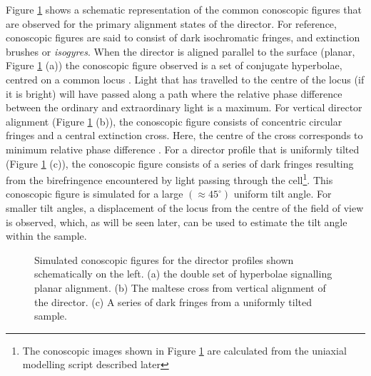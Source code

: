 Figure \ref{fig:con_samples} shows a schematic representation of the common conoscopic figures that are observed for the primary alignment states of the director. For reference, conoscopic figures are said to consist of dark isochromatic fringes, and extinction brushes or \textit{isogyres}. When the director is aligned parallel to the surface (planar, Figure \ref{fig:con_samples} (a)) the conoscopic figure observed is a set of conjugate hyperbolae, centred on a common locus \cite{Horn2001}. Light that has travelled to the centre of the locus (if it is bright) will have passed along a path where the relative phase difference between the ordinary and extraordinary light is a maximum. For vertical director alignment (Figure \ref{fig:con_samples} (b)), the conoscopic figure consists of concentric circular fringes and a central extinction cross. Here, the centre of the cross corresponds to minimum relative phase difference \cite{Horn2001}. For a director profile that is uniformly tilted (Figure \ref{fig:con_samples} (c)), the conoscopic figure consists of a series of dark fringes resulting from the birefringence encountered by light passing through the cell\footnote{The conoscopic images shown in Figure \ref{fig:con_samples} are calculated from the uniaxial modelling script described later}. This conoscopic figure is simulated for a large $\left(\approx45^{\circ}\right)$ uniform tilt angle. For smaller tilt angles, a displacement of the locus from the centre of the field of view is observed, which, as will be seen later, can be used to estimate the tilt angle within the sample.

\begin{figure}
\begin{center}
\end{center}
\caption[Simulated conoscopic images for planar, vertical and tilted alignment]{\label{fig:con_samples}Simulated conoscopic figures for the director profiles shown schematically on the left. (a) the double set of hyperbolae signalling planar alignment. (b) The maltese cross from vertical alignment of the director. (c) A series of dark fringes from a uniformly tilted sample.}
\end{figure}

